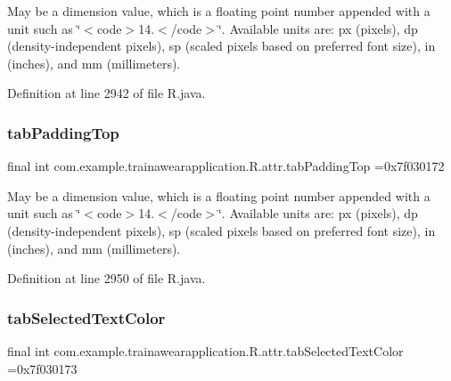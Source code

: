 May be a dimension value, which is a floating point number appended with a unit such as \char`\"{}$<$code$>$14.\+5sp$<$/code$>$\char`\"{}. Available units are\+: px (pixels), dp (density-\/independent pixels), sp (scaled pixels based on preferred font size), in (inches), and mm (millimeters). 

Definition at line 2942 of file R.\+java.

\mbox{\label{classcom_1_1example_1_1trainawearapplication_1_1_r_1_1attr_a6ab259800ce809ed57002b08ff33214c}} 
\subsubsection{\texorpdfstring{tabPaddingTop}{tabPaddingTop}}
{\footnotesize\ttfamily final int com.\+example.\+trainawearapplication.\+R.\+attr.\+tab\+Padding\+Top =0x7f030172\hspace{0.3cm}{\ttfamily [static]}}

May be a dimension value, which is a floating point number appended with a unit such as \char`\"{}$<$code$>$14.\+5sp$<$/code$>$\char`\"{}. Available units are\+: px (pixels), dp (density-\/independent pixels), sp (scaled pixels based on preferred font size), in (inches), and mm (millimeters). 

Definition at line 2950 of file R.\+java.

\mbox{\label{classcom_1_1example_1_1trainawearapplication_1_1_r_1_1attr_af7c545616ba0518eba8b3b1d51d9ed3f}} 
\subsubsection{\texorpdfstring{tabSelectedTextColor}{tabSelectedTextColor}}
{\footnotesize\ttfamily final int com.\+example.\+trainawearapplication.\+R.\+attr.\+tab\+Selected\+Text\+Color =0x7f030173\hspace{0.3cm}{\ttfamily [static]}}

